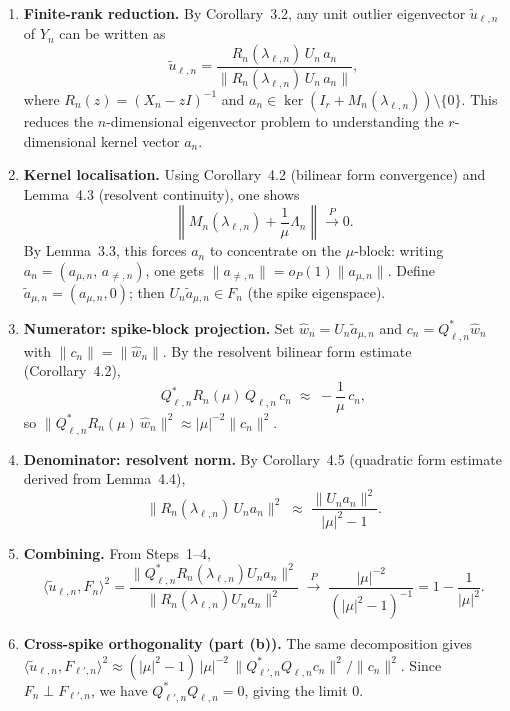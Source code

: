 \documentclass[11pt,a4paper]{article}
\begin{document}
\begin{enumerate}[label=\textbf{Step \arabic*:}, leftmargin=2.5em]

\item \textbf{Finite-rank reduction.}  By Corollary~3.2, any unit outlier eigenvector $\tilde{u}_{\ell,n}$ of $Y_n$ can be written as
\[
\tilde{u}_{\ell,n} = \frac{R_n(\lambda_{\ell,n})\, U_n\, a_n}{\|R_n(\lambda_{\ell,n})\, U_n\, a_n\|},
\]
where $R_n(z) = (X_n - zI)^{-1}$ and $a_n \in \ker(I_r + M_n(\lambda_{\ell,n})) \setminus \{0\}$.  This reduces the $n$-dimensional eigenvector problem to understanding the $r$-dimensional kernel vector $a_n$.

\item \textbf{Kernel localisation.}  Using Corollary~4.2 (bilinear form convergence) and Lemma~4.3 (resolvent continuity), one shows
\[
\left\| M_n(\lambda_{\ell,n}) + \frac{1}{\mu}\Lambda_n \right\| \xrightarrow{P} 0.
\]
By Lemma~3.3, this forces $a_n$ to concentrate on the $\mu$-block: writing $a_n = (a_{\mu,n},\, a_{\neq,n})$, one gets $\|a_{\neq,n}\| = o_P(1) \|a_{\mu,n}\|$.  Define $\tilde{a}_{\mu,n} = (a_{\mu,n}, 0)$; then $U_n \tilde{a}_{\mu,n} \in F_n$ (the spike eigenspace).

\item \textbf{Numerator: spike-block projection.}  Set $\hat{w}_n = U_n \tilde{a}_{\mu,n}$ and $c_n = Q_{\ell,n}^* \hat{w}_n$ with $\|c_n\| = \|\hat{w}_n\|$.  By the resolvent bilinear form estimate (Corollary~4.2),
\[
Q_{\ell,n}^* R_n(\mu)\, Q_{\ell,n}\, c_n \;\approx\; -\frac{1}{\mu}\, c_n,
\]
so $\|Q_{\ell,n}^* R_n(\mu)\, \hat{w}_n\|^2 \approx |\mu|^{-2} \|c_n\|^2$.

\item \textbf{Denominator: resolvent norm.}  By Corollary~4.5 (quadratic form estimate derived from Lemma~4.4),
\[
\|R_n(\lambda_{\ell,n})\, U_n a_n\|^2 \;\approx\; \frac{\|U_n a_n\|^2}{|\mu|^2 - 1}.
\]

\item \textbf{Combining.}  From Steps~1--4,
\[
\langle \tilde{u}_{\ell,n}, F_n \rangle^2 = \frac{\|Q_{\ell,n}^* R_n(\lambda_{\ell,n}) U_n a_n\|^2}{\|R_n(\lambda_{\ell,n}) U_n a_n\|^2} \;\xrightarrow{P}\; \frac{|\mu|^{-2}}{(|\mu|^2-1)^{-1}} = 1 - \frac{1}{|\mu|^2}.
\]

\item \textbf{Cross-spike orthogonality (part (b)).}  The same decomposition gives $\langle \tilde{u}_{\ell,n}, F_{\ell',n}\rangle^2 \approx (|\mu|^2-1)\, |\mu|^{-2}\, \|Q_{\ell',n}^* Q_{\ell,n} c_n\|^2 / \|c_n\|^2$.  Since $F_n \perp F_{\ell',n}$, we have $Q_{\ell',n}^* Q_{\ell,n} = 0$, giving the limit $0$.
\end{enumerate}
\end{document}

